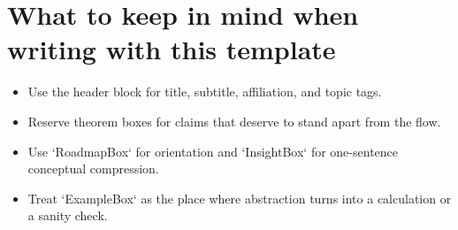 \documentclass[11pt]{article}
\theoremstyle{plain}
\theoremstyle{definition}
\theoremstyle{remark}
\begin{document}
\section{What to keep in mind when writing with this template}

\begin{itemize}
  \item Use the header block for title, subtitle, affiliation, and topic tags.
  \item Reserve theorem boxes for claims that deserve to stand apart from the flow.
  \item Use `RoadmapBox` for orientation and `InsightBox` for one-sentence conceptual compression.
  \item Treat `ExampleBox` as the place where abstraction turns into a calculation or a sanity check.
\end{itemize}
\end{document}
